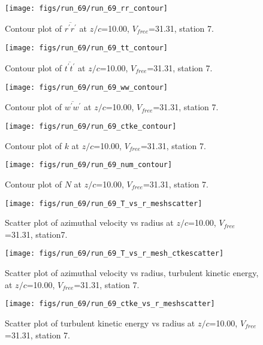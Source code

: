 \begin{figure}[H]
\centering
\texttt{[image: figs/run\_69/run\_69\_rr\_contour]}
\caption{Contour plot of $\overline{r^\prime r^\prime}$ at $z/c$=10.00, $V_{free}$=31.31, station 7.}
\label{fig:run_69_rr_contour}
\end{figure}


\begin{figure}[H]
\centering
\texttt{[image: figs/run\_69/run\_69\_tt\_contour]}
\caption{Contour plot of $\overline{t^\prime t^\prime}$ at $z/c$=10.00, $V_{free}$=31.31, station 7.}
\label{fig:run_69_tt_contour}
\end{figure}


\begin{figure}[H]
\centering
\texttt{[image: figs/run\_69/run\_69\_ww\_contour]}
\caption{Contour plot of $\overline{w^\prime w^\prime}$ at $z/c$=10.00, $V_{free}$=31.31, station 7.}
\label{fig:run_69_ww_contour}
\end{figure}


\begin{figure}[H]
\centering
\texttt{[image: figs/run\_69/run\_69\_ctke\_contour]}
\caption{Contour plot of $k$ at $z/c$=10.00, $V_{free}$=31.31, station 7.}
\label{fig:run_69_ctke_contour}
\end{figure}


\begin{figure}[H]
\centering
\texttt{[image: figs/run\_69/run\_69\_num\_contour]}
\caption{Contour plot of $N$ at $z/c$=10.00, $V_{free}$=31.31, station 7.}
\label{fig:run_69_num_contour}
\end{figure}


\begin{figure}[H]
\centering
\texttt{[image: figs/run\_69/run\_69\_T\_vs\_r\_meshscatter]}
\caption{Scatter plot of azimuthal velocity vs radius at $z/c$=10.00, $V_{free}$=31.31, station7.}
\label{fig:run_69_T_vs_r_meshscatter}
\end{figure}


\begin{figure}[H]
\centering
\texttt{[image: figs/run\_69/run\_69\_T\_vs\_r\_mesh\_ctkescatter]}
\caption{Scatter plot of azimuthal velocity vs radius, turbulent kinetic energy, at $z/c$=10.00, $V_{free}$=31.31, station 7.}
\label{fig:run_69_T_vs_r_mesh_ctkescatter}
\end{figure}


\begin{figure}[H]
\centering
\texttt{[image: figs/run\_69/run\_69\_ctke\_vs\_r\_meshscatter]}
\caption{Scatter plot of turbulent kinetic energy vs radius at $z/c$=10.00, $V_{free}$=31.31, station 7.}
\label{fig:run_69_ctke_vs_r_meshscatter}
\end{figure}


